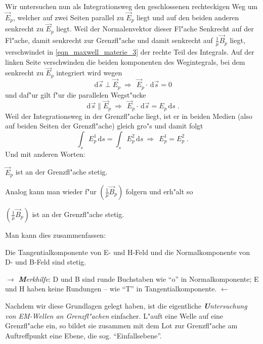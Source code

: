 \documentclass[twoside,a4paper]{book}
\newcommand{\st}[1]{{\slshape \textbf #1}}
\newcommand{\diff}{\ensuremath{\, \mathrm{d}}}
\newcommand{\Folgt}{\ensuremath{~ \Rightarrow ~ ~ }}
\newcommand{\abs}[0]{\bigskip \noindent}
\newenvironment*{Einschub}[0]{$\rightarrow$ \indent}{$\leftarrow$}
\begin{document}
Wir untersuchen nun als Integrationsweg den geschlossenen rechteckigen
Weg um $\vec E_p$, welcher auf zwei Seiten parallel zu $\vec E_p$
liegt und auf den beiden anderen senkrecht zu $\vec E_p$ liegt. Weil
der Normalenvektor dieser Fl"ache Senkrecht auf der Fl"ache, damit
senkrecht zur Grenzfl"ache und damit senkrecht auf $\frac{1}{\mu}\vec
B_p$ liegt, verschwindet in \eqref{eqn_maxwell_materie_3} der rechte
Teil des Integrals. Auf der linken Seite verschwinden die beiden
komponenten des Wegintegrals, bei dem senkrecht zu $\vec E_p$
integriert wird wegen
\begin{equation*}
   \diff \vec s \perp \vec E_p \Folgt \vec E_p \cdot \diff \vec s = 0
\end{equation*}
und daf"ur gilt f"ur die parallelen Wegst"ucke
\begin{equation*}
   \diff \vec s \parallel \vec E_p \Folgt \vec E_p \cdot \diff \vec s
   = E_p \diff s \;.
\end{equation*}
Weil der Integrationsweg in der Grenzfl"ache liegt, ist er in beiden
Medien (also auf beiden Seiten der Grenzfl"ache) gleich gro"s und
damit folgt
\begin{equation}
   \label{eq:42}
   \int_s E_p^1 \diff s = \int_s E_p^2 \diff s \Folgt E_p^1 = E_p^2 \;.
\end{equation}
Und mit anderen Worten:
\begin{Wichtig}
   $\vec E_p$ ist an der Grenzfl"ache stetig.
\end{Wichtig}

\abs
Analog kann man wieder f"ur $(\frac{1}{\mu}\vec B_p)$ folgern und
erh"alt so
\begin{Wichtig}
   $(\frac{1}{\mu} \vec B_p)$ ist an der Grenzfl"ache stetig.
\end{Wichtig}

Man kann dies zusammenfassen:
\begin{Wichtig}
   Die Tangentialkomponente von E- und H-Feld und die Normalkomponente
   von D- und B-Feld sind stetig.
\end{Wichtig}
\begin{Einschub}
   \st{Merkhilfe}: D und B sind runde Buchstaben wie "`o"' in
   Normalkomponente; E und H haben keine Rundungen -- wie "`T"' in
   Tangentialkomponente.
\end{Einschub}




\abs Nachdem wir diese Grundlagen gelegt haben, ist die eigentliche
\st{Untersuchung von EM-Wellen an Grenzfl"achen} einfacher. L"auft eine
Welle auf eine Grenzfl"ache ein, so bildet sie zusammen mit dem Lot
zur Grenzfl"ache am Auftreffpunkt eine Ebene, die
sog. "`Einfallsebene"'. 
\end{document}
